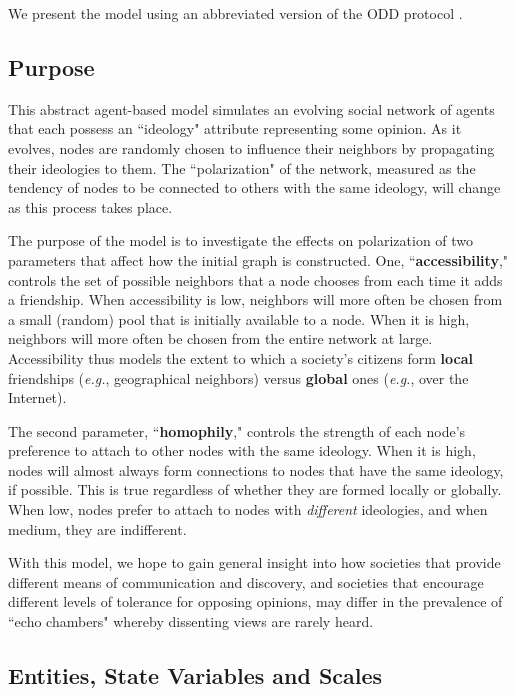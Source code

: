 
\label{sec:model}

We present the model using an abbreviated version of the ODD protocol
\cite{polhill_using_2008}.

\subsection{Purpose}

This abstract agent-based model simulates an evolving social network of agents
that each possess an ``ideology" attribute representing some opinion. As it
evolves, nodes are randomly chosen to influence their neighbors by propagating
their ideologies to them. The ``polarization" of the network, measured as the
tendency of nodes to be connected to others with the same ideology, will
change as this process takes place. 

The purpose of the model is to investigate the effects on polarization of two
parameters that affect how the initial graph is constructed. One,
``\textbf{accessibility}," controls the set of possible neighbors that a node
chooses from each time it adds a friendship. When accessibility is low,
neighbors will more often be chosen from a small (random) pool that is
initially available to a node. When it is high, neighbors will more often be
chosen from the entire network at large. Accessibility thus models the extent
to which a society's citizens form \textbf{local} friendships (\textit{e.g.},
geographical neighbors) versus \textbf{global} ones (\textit{e.g.}, over the
Internet).

The second parameter, ``\textbf{homophily}," controls the strength of each
node's preference to attach to other nodes with the same ideology. When it is
high, nodes will almost always form connections to nodes that have the same
ideology, if possible. This is true regardless of whether they are formed
locally or globally. When low, nodes prefer to attach to nodes with
\textit{different} ideologies, and when medium, they are indifferent.

With this model, we hope to gain general insight into how societies that
provide different means of communication and discovery, and societies that
encourage different levels of tolerance for opposing opinions, may differ in
the prevalence of ``echo chambers" whereby dissenting views are rarely heard.

\subsection{Entities, State Variables and Scales}

